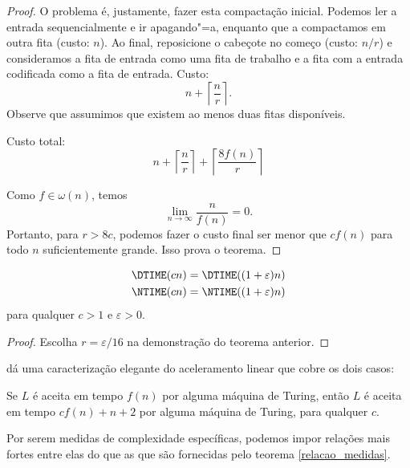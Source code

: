 \begin{proof}
    O problema é,
    justamente,
    fazer esta compactação inicial.
    Podemos ler a entrada sequencialmente
    e ir apagando"=a,
    enquanto que a compactamos em outra fita
    (custo: $n$).
    Ao final,
    reposicione o cabeçote no começo
    (custo: $n/r$)
    e consideramos a fita de entrada como uma fita de trabalho
    e a fita com a entrada codificada
    como a fita de entrada.
    Custo:
    \begin{equation*}
        n + \left\lceil \frac n r \right\rceil.
    \end{equation*}
    Observe que assumimos
    que existem ao menos duas fitas disponíveis.

    Custo total:
    \begin{equation*}
        n + \left\lceil \frac n r \right\rceil +
            \left\lceil \frac{8f(n)}{r} \right\rceil
    \end{equation*}

    Como $f \in \omega(n)$, temos
    \begin{equation*}
        \lim_{n \rightarrow \infty} \frac{n}{f(n)} = 0.
    \end{equation*}
    Portanto, para $r > 8c$,
    podemos fazer o custo final
    ser menor que $cf(n)$ para todo $n$ suficientemente grande.
    Isso prova o teorema.
\end{proof}

\begin{theorem}
    \begin{align*}
        \DTIME(cn) &= \DTIME((1+\varepsilon)n) \\
        \NTIME(cn) &= \NTIME((1+\varepsilon)n)
    \end{align*}
    para qualquer $c > 1$ e $\varepsilon > 0$.
\end{theorem}

\begin{proof}
    Escolha $r = \varepsilon/16$ na demonstração do teorema anterior.
\end{proof}

dá uma caracterização elegante do aceleramento linear
que cobre os dois casos:
\begin{utheorem}
    Se $L$ é aceita em tempo $f(n)$ por alguma máquina de Turing,
    então $L$ é aceita em tempo $cf(n) + n + 2$ por alguma máquina de Turing,
    para qualquer $c$.
\end{utheorem}

Por serem medidas de complexidade específicas,
podemos impor relações mais fortes entre elas
do que as que são fornecidas pelo teorema \ref{relacao_medidas}.


